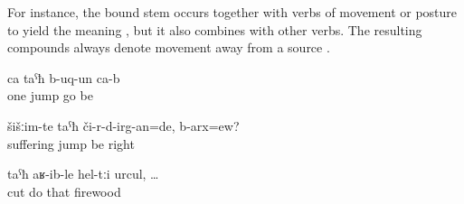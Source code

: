 For instance, the bound stem  occurs together with verbs of movement or posture to yield the meaning , but it also combines with other verbs. The resulting compounds always denote movement away from a source .
%
\begin{exe}
	\ex	\label{ex:One (boar) jumped (down)}
	\gll	ca	taˁħ	b-uq-un	ca-b\\
		one	jump	go	be\\
	\glt	{}

	\ex	\label{ex:I would distract from the sorrows, right}
	\gll	šišːim-te	taˁħ	či-r-d-irg-an=de,	b-arx=ew?\\
		suffering	jump	be	right\\
	\glt	{}

	\ex	\label{ex:when (they) cut off the wood}
	\gll	taˁħ	aʁ-ib-le	hel-tːi	urcul,	\ldots\\
		cut	do	that	firewood\\
	\glt	{}
\end{exe}

